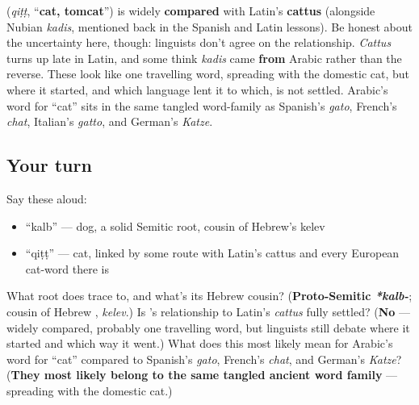 \begin{culture}
\textbf{} (\emph{qiṭṭ}, \textquotedblleft{}\textbf{cat, tomcat}\textquotedblright{}) is widely \textbf{compared} with Latin's \textbf{cattus} (alongside Nubian \emph{kadis}, mentioned back in the Spanish and Latin lessons). Be honest about the uncertainty here, though: linguists don't agree on the relationship. \emph{Cattus} turns up late in Latin, and some think \emph{kadis} came \textbf{from} Arabic rather than the reverse. These look like one travelling word, spreading with the domestic cat, but where it started, and which language lent it to which, is not settled. Arabic's word for \textquotedblleft{}cat\textquotedblright{} sits in the same tangled word-family as Spanish's \emph{gato}, French's \emph{chat}, Italian's \emph{gatto}, and German's \emph{Katze}.
\end{culture}

\subsection*{Your turn}
Say these aloud:

\begin{itemize}
\raggedright
  \item \textquotedblleft{}kalb\textquotedblright{} — dog, a solid Semitic root, cousin of Hebrew's kelev
  \item \textquotedblleft{}qiṭṭ\textquotedblright{} — cat, linked by some route with Latin's cattus and every European cat-word there is
\end{itemize}

\begin{tcolorbox}[breakable,colback=teal!4,colframe=teal!35!black,title={Before you move on}]
What root does \textbf{} trace to, and what's its Hebrew cousin? (\textbf{Proto-Semitic \emph{*kalb-}}; cousin of Hebrew \textbf{}, \emph{kelev}.) Is \textbf{}'s relationship to Latin's \emph{cattus} fully settled? (\textbf{No} — widely compared, probably one travelling word, but linguists still debate where it started and which way it went.) What does this most likely mean for Arabic's word for \textquotedblleft{}cat\textquotedblright{} compared to Spanish's \emph{gato}, French's \emph{chat}, and German's \emph{Katze}? (\textbf{They most likely belong to the same tangled ancient word family} — spreading with the domestic cat.)
\end{tcolorbox}
